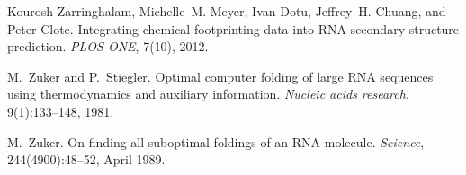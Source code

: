 \begin{DoxyDescription}
\item[\label{_CITEREF_zarringhalam:2012}%
\mbox{[}25\mbox{]}]Kourosh Zarringhalam, Michelle~M. Meyer, Ivan Dotu, Jeffrey~H. Chuang, and Peter Clote. Integrating chemical footprinting data into R\+NA secondary structure prediction. {\itshape P\+L\+OS O\+NE}, 7(10), 2012.


\item[\label{_CITEREF_zuker:1981}%
\mbox{[}26\mbox{]}]M.~Zuker and P.~Stiegler. Optimal computer folding of large R\+NA sequences using thermodynamics and auxiliary information. {\itshape Nucleic acids research}, 9(1)\+:133--148, 1981.


\item[\label{_CITEREF_zuker:1989}%
\mbox{[}27\mbox{]}]M.~Zuker. On finding all suboptimal foldings of an R\+NA molecule. {\itshape Science}, 244(4900)\+:48--52, April 1989.


\end{DoxyDescription}